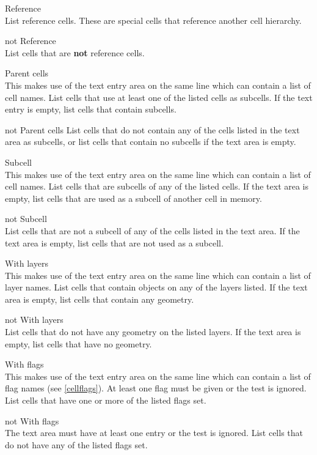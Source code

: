 \begin{description}
\item{\cb Reference}\\
List reference cells.  These are special
cells that reference another cell hierarchy.
\item{\cb not Reference}\\
List cells that are {\bf not} reference cells.

\item{\cb Parent cells}\\
This makes use of the text entry area on the same line which can
contain a list of cell names.  List cells that use at least one of the
listed cells as subcells.  If the text entry is empty, list cells that
contain subcells.
\item{\cb not Parent cells}
List cells that do not contain any of the cells listed in the text
area as subcells, or list cells that contain no subcells if the text
area is empty.

\item{\cb Subcell}\\
This makes use of the text entry area on the same line which can
contain a list of cell names.  List cells that are subcells of any of
the listed cells.  If the text area is empty, list cells that are used
as a subcell of another cell in memory.
\item{\cb not Subcell}\\
List cells that are not a subcell of any of the cells listed in the
text area.  If the text area is empty, list cells that are not used as
a subcell.

\item{\cb With layers}\\
This makes use of the text entry area on the same line which can
contain a list of layer names.  List cells that contain objects on any
of the layers listed.  If the text area is empty, list cells that
contain any geometry.
\item{\cb not With layers}\\
List cells that do not have any geometry on the listed layers.  If the
text area is empty, list cells that have no geometry.

\item{\cb With flags}\\
This makes use of the text entry area on the same line which can
contain a list of flag names (see \ref{cellflags}).  At least one flag
must be given or the test is ignored.  List cells that have one or
more of the listed flags set.
\item{\cb not With flags}\\
The text area must have at least one entry or the test is ignored. 
List cells that do not have any of the listed flags set.


\end{description}

